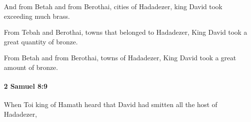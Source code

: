 			\begin{versebox}
					\item[BHS] 
					\item[ASV] And from Betah and from Berothai, cities of Hadadezer, king David took exceeding much brass.
					\item[NIV] From Tebah and Berothai, towns that belonged to Hadadezer, King David took a great quantity of bronze.
					\item[NRSV] From Betah and from Berothai, towns of Hadadezer, King David took a great amount of bronze.
			\end{versebox}

		\paragraph{2 Samuel 8:9} %
			\label{2SAMUEL-8-9}

			When Toi king of Hamath heard that David had smitten all the host of Hadadezer,

